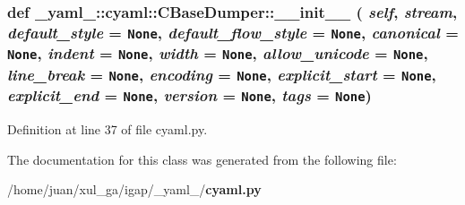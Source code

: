 \subsubsection{\setlength{\rightskip}{0pt plus 5cm}def \_\-yaml\_\-::cyaml::CBaseDumper::\_\-\_\-init\_\-\_\- ( {\em self},  {\em stream},  {\em default\_\-style} = {\tt None},  {\em default\_\-flow\_\-style} = {\tt None},  {\em canonical} = {\tt None},  {\em indent} = {\tt None},  {\em width} = {\tt None},  {\em allow\_\-unicode} = {\tt None},  {\em line\_\-break} = {\tt None},  {\em encoding} = {\tt None},  {\em explicit\_\-start} = {\tt None},  {\em explicit\_\-end} = {\tt None},  {\em version} = {\tt None},  {\em tags} = {\tt None})}\label{class__yaml___1_1cyaml_1_1CBaseDumper_021d9b1c1e209d903a825f865e035e7d}




Definition at line 37 of file cyaml.py.

The documentation for this class was generated from the following file:\begin{CompactItemize}
\item 
/home/juan/xul\_\-ga/igap/\_\-yaml\_\-/{\bf cyaml.py}\end{CompactItemize}
